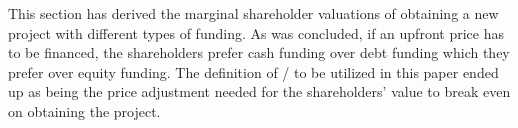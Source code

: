 \documentclass[main.tex]{subfiles}
\begin{document}
    This section has derived the marginal shareholder valuations of obtaining a new project
    with different types of funding.
    As was concluded, if an upfront price has to be financed,
    the shareholders prefer cash funding over debt funding
    which they prefer over equity funding.
    The definition of \FVA/ to be utilized in this paper ended up as being the price adjustment needed
    for the shareholders' value to break even on obtaining the project.
\end{document}
